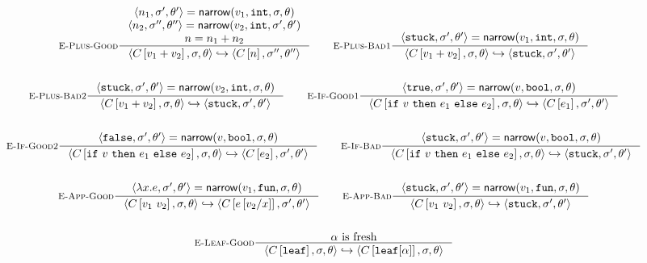 \begin{figure*}
\begin{gather*}
\inference[\replusgood]
  {\triple{n_1}{\vsu'}{\tsu'} = \force{v_1}{\tint}{\vsu}{\tsu} \\
   \triple{n_2}{\vsu''}{\tsu''} = \force{v_2}{\tint}{\vsu'}{\tsu'} \\
   n = \eplus{n_1}{n_2}}
  {\step{\inctx{\eplus{v_1}{v_2}}}{\vsu}{\tsu}{\inctx{n}}{\vsu''}{\tsu''}}
\qquad
\inference[\replusbadone]
  {\triple{\stuck}{\vsu'}{\tsu'} = \force{v_1}{\tint}{\vsu}{\tsu}}
  {\step{\inctx{\eplus{v_1}{v_2}}}{\vsu}{\tsu}{\stuck}{\vsu'}{\tsu'}}
\\ \\
\inference[\replusbadtwo]
  {\triple{\stuck}{\vsu'}{\tsu'} = \force{v_2}{\tint}{\vsu}{\tsu}}
  {\step{\inctx{\eplus{v_1}{v_2}}}{\vsu}{\tsu}{\stuck}{\vsu'}{\tsu'}}
\qquad
\inference[\reifgoodone]
  {\triple{\etrue}{\vsu'}{\tsu'} = \force{v}{\tbool}{\vsu}{\tsu}}
  {\step{\inctx{\eif{v}{e_1}{e_2}}}{\vsu}{\tsu}{\inctx{e_1}}{\vsu'}{\tsu'}}
\\ \\
\inference[\reifgoodtwo]
  {\triple{\efalse}{\vsu'}{\tsu'} = \force{v}{\tbool}{\vsu}{\tsu}}
  {\step{\inctx{\eif{v}{e_1}{e_2}}}{\vsu}{\tsu}{\inctx{e_2}}{\vsu'}{\tsu'}}
\qquad
\inference[\reifbad]
  {\triple{\stuck}{\vsu'}{\tsu'} = \force{v}{\tbool}{\vsu}{\tsu}}
  {\step{\inctx{\eif{v}{e_1}{e_2}}}{\vsu}{\tsu}{\stuck}{\vsu'}{\tsu'}}
\\ \\
\inference[\reappgood]
  {\triple{\efun{x}{e}}{\vsu'}{\tsu'} = \force{v_1}{\tfun}{\vsu}{\tsu}}
  {\step{\inctx{\eapp{v_1}{v_2}}}{\vsu}{\tsu}{\inctx{e\sub{x}{v_2}}}{\vsu'}{\tsu'}}
\qquad
\inference[\reappbad]
  {\triple{\stuck}{\vsu'}{\tsu'} = \force{v_1}{\tfun}{\vsu}{\tsu}}
  {\step{\inctx{\eapp{v_1}{v_2}}}{\vsu}{\tsu}{\stuck}{\vsu'}{\tsu'}}
\\ \\
\inference[\releafgood]
  {\thole \mbox{ is fresh}}
  {\step{\inctx{\eleaf}}{\vsu}{\tsu}{\inctx{\vleaf{\thole}}}{\vsu}{\tsu}}

\end{gather*}
\end{figure*}
